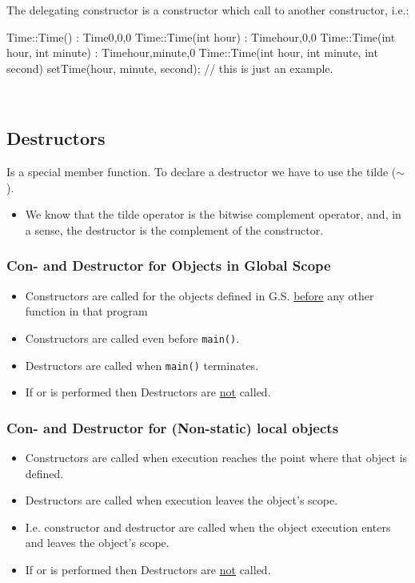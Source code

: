 \noindent The delegating constructor is a constructor which call to another constructor, i.e.:\\
\begin{minipage}{\MPWxLARGExLISTING\textwidth} %
{} %
\begin{CPPCode}
Time::Time() : Time{0,0,0} {} 
Time::Time(int hour) : Time{hour,0,0} {}
Time::Time(int hour, int minute) : Time{hour,minute,0} {}
Time::Time(int hour, int minute, int second) 
{
    setTime(hour, minute, second); // this is just an example.
}
\end{CPPCode}
\end{minipage}\\

\subsection{Destructors}
Is a special member function. To declare a destructor we have to use the tilde ($\sim$).
\begin{itemize}
    \item We know that the tilde operator is the bitwise complement operator, and, in a sense, the destructor is the complement of the constructor.
\end{itemize}

\subsubsection{Con- and Destructor for Objects in Global Scope}
\begin{itemize}
    \item Constructors are called for the objects defined in G.S. \underline{before} any other function in that program
    \item Constructors are called even before \texttt{main()}.
    \item Destructors are called when \texttt{main()} terminates.
    \item If  or  is performed then Destructors are \underline{not} called.
\end{itemize}

\subsubsection{Con- and Destructor for (Non-static) local objects}
\begin{itemize}
    \item Constructors are called when execution reaches the point where that object is defined.
    \item Destructors are called when execution leaves the object's scope.
    \item I.e. constructor and destructor are called when the object execution enters and leaves the object's scope.
    \item If  or  is performed then Destructors are \underline{not} called.
\end{itemize}

